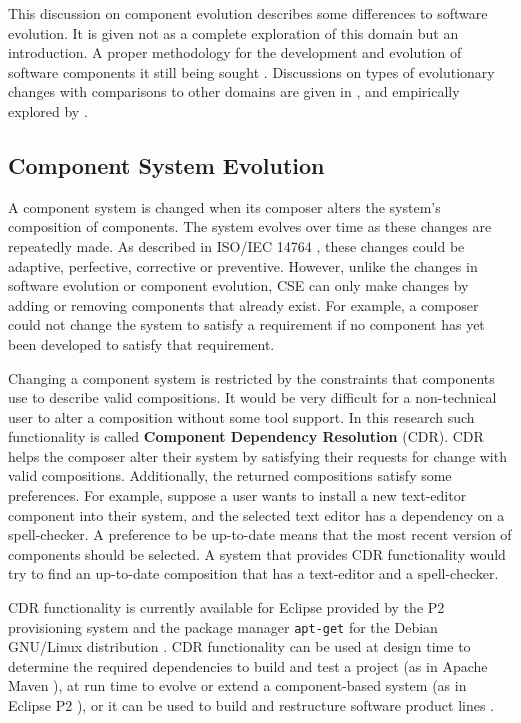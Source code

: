 This discussion on component evolution describes some differences to software evolution.
It is given not as a complete exploration of this domain but an introduction. 
A proper methodology for the development and evolution of software components it still being sought \citep{Szyperski2002}.
Discussions on types of evolutionary changes with comparisons to other domains are given in \citep{Papazoglou2011},
and empirically explored by \cite{vasa2007patterns}.

\subsection{Component System Evolution}
A component system is changed when its composer alters the system's composition of components.
The system evolves over time as these changes are repeatedly made.
As described in ISO/IEC 14764 \citep{IsoIec2006}, these changes could be adaptive, perfective, corrective or preventive.
However, unlike the changes in software evolution or component evolution, CSE can only make changes by adding or removing components that already exist.
For example, a composer could not change the system to satisfy a requirement if no component has yet been developed to satisfy that requirement.

Changing a component system is restricted by the constraints that components use to describe valid compositions. 
It would be very difficult for a non-technical user to alter a composition without some tool support.
In this research such functionality is called  \textbf{Component Dependency Resolution} (CDR).
CDR helps the composer alter their system by satisfying their requests for change with valid compositions.
Additionally, the returned compositions satisfy some preferences.
For example, suppose a user wants to install a new text-editor component into their system, and the selected text editor has a dependency on a spell-checker.
A preference to be up-to-date means that the most recent version of components should be selected.
A system that provides CDR functionality would try to find an up-to-date composition that has a text-editor and a spell-checker.

CDR functionality is currently available for Eclipse provided by the P2 provisioning system \citep{leBerre2010}
and the package manager \texttt{apt-get} for the Debian GNU/Linux distribution \citep{Barth2005}.
CDR functionality can be used at design time to determine the required dependencies to build and test a project (as in Apache Maven \citep{casey_better_2008}),
at run time to evolve or extend a component-based system (as in Eclipse P2 \citep{leBerre2010}),
or it can be used to build and restructure software product lines \citep{savolainen_analyzing_2007}.

